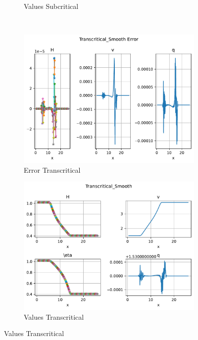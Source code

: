 \documentclass[pt12]{beamer}
\begin{document}
\begin{frame}
\begin{figure}
\begin{subfigure}[b]{0.39\textwidth}
         \caption{Values Subcritical}
     \end{subfigure}\\
     \begin{subfigure}[b]{0.39\textwidth}
         \centering
         \includegraphics[width=\textwidth]{figures/debug/trans/errors_lagr.pdf}
         \caption{Error Transcritical}
     \end{subfigure}
     \begin{subfigure}[b]{0.39\textwidth}
         \centering
         \includegraphics[width=\textwidth]{figures/debug/trans/values_lagr.pdf}
         \caption{Values Transcritical}
     \end{subfigure}
\end{figure}



\end{frame}
\end{document}
